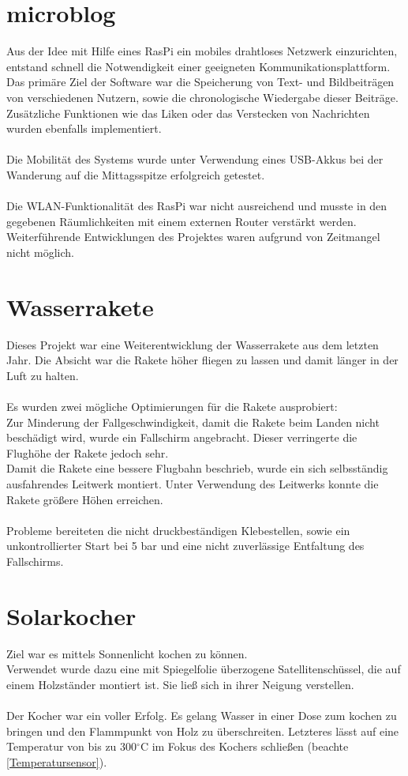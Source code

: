 \documentclass[
  bibliography=totoc,     %
  captions=tableheading,  %
  titlepage=firstiscover, %
  twocolumn,
]{scrartcl}
\begin{document}
\section{microblog}
Aus der Idee mit Hilfe eines RasPi ein mobiles drahtloses Netzwerk einzurichten, entstand schnell die Notwendigkeit einer geeigneten Kommunikationsplattform.
Das primäre Ziel der Software war die Speicherung von Text- und Bildbeiträgen von verschiedenen Nutzern, sowie die chronologische Wiedergabe dieser Beiträge.
Zusätzliche Funktionen wie das Liken oder das Verstecken von Nachrichten wurden ebenfalls implementiert.\\
\\
Die Mobilität des Systems wurde unter Verwendung eines USB-Akkus bei der Wanderung auf die Mittagsspitze erfolgreich getestet.\\
\\
Die WLAN-Funktionalität des RasPi war nicht ausreichend und musste in den gegebenen Räumlichkeiten mit einem externen Router verstärkt werden.
Weiterführende Entwicklungen des Projektes waren aufgrund von Zeitmangel nicht möglich.

\section{Wasserrakete}
Dieses Projekt war eine Weiterentwicklung der Wasserrakete aus dem letzten Jahr.
Die Absicht war die Rakete höher fliegen zu lassen und damit länger in der Luft zu halten.\\
\\
Es wurden zwei mögliche Optimierungen für die Rakete ausprobiert:\\
Zur Minderung der Fallgeschwindigkeit, damit die Rakete beim Landen nicht beschädigt wird, wurde ein Fallschirm angebracht.
Dieser verringerte die Flughöhe der Rakete jedoch sehr.\\
Damit die Rakete eine bessere Flugbahn beschrieb, wurde ein sich selbsständig ausfahrendes Leitwerk montiert.
Unter Verwendung des Leitwerks konnte die Rakete größere Höhen erreichen.\\
\\
Probleme bereiteten die nicht druckbeständigen Klebestellen, sowie ein unkontrollierter Start bei 5 bar und eine nicht zuverlässige Entfaltung des Fallschirms.

\section{Solarkocher}
Ziel war es mittels Sonnenlicht kochen zu können.\\
Verwendet wurde dazu eine mit Spiegelfolie überzogene Satellitenschüssel, die auf einem Holzständer montiert ist.
Sie ließ sich in ihrer Neigung verstellen.\\
\\
Der Kocher war ein voller Erfolg.
Es gelang Wasser in einer Dose zum kochen zu bringen und den Flammpunkt von Holz zu überschreiten.
Letzteres lässt auf eine Temperatur von bis zu 300$^\circ$C im Fokus des Kochers schließen (beachte \ref{Temperatursensor}).
\end{document}
